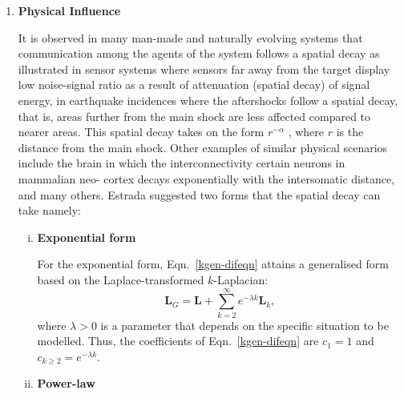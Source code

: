 \documentclass[10pt,a4paper]{article}
\begin{document}
\begin{enumerate}[1)]
    	    	 
    	    	
    	    	\item \textbf{Physical Influence}
    	    	
    	    	It is observed in many man-made and naturally evolving systems that communication among the agents of the system follows a spatial decay as illustrated in sensor systems where sensors far away from the target display low noise-signal ratio as a result of attenuation (spatial decay) of signal energy, in earthquake incidences where the aftershocks follow a spatial decay, that is, areas further from the main shock are less affected compared to nearer areas. This spatial decay takes on the form $r ^{-\alpha}$ , where $r$ is the distance from the main shock. Other examples of similar physical scenarios include the brain in which the interconnectivity certain neurons in mammalian neo-
    	    	cortex decays exponentially with the intersomatic distance, and many others.
    	    	Estrada \citep{estrada2012path} suggested two forms that the spatial decay can take namely:
    	    	
    	        \begin{enumerate}[i)]
    	    	\item \textbf{Exponential form}
    	    	
    	    	For the exponential form, Eqn.~\ref{kgen-difeqn} attains a generalised form based on the Laplace-transformed $k$-Laplacian:
    	    	\begin{equation}
    	    	\mathbf{L}_{G} = \mathbf{L} + \sum_{k=2}^{\infty} e^{-\lambda k} \mathbf{L}_k, 
    	    	\label{laplacetransform}
    	    	\end{equation}
    	    	where $\lambda >0$ is a parameter that depends on the specific situation to be modelled.
    	    	Thus, the coefficients of Eqn.~\ref{kgen-difeqn} are $c_1 = 1$ and $c_{k \geq 2} = e^{-\lambda k}$.
				
    	    	\item \textbf{Power-law }
    	    	

\end{enumerate}
\end{enumerate}
\end{document}
